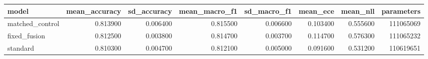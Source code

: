 \begin{tabular}{lrrrrrrr}
\toprule
model & mean\_accuracy & sd\_accuracy & mean\_macro\_f1 & sd\_macro\_f1 & mean\_ece & mean\_nll & parameters \\
\midrule
matched\_control & 0.813900 & 0.006400 & 0.815500 & 0.006600 & 0.103400 & 0.555600 & 111065069 \\
fixed\_fusion & 0.812500 & 0.003800 & 0.814700 & 0.003700 & 0.114700 & 0.576300 & 111065232 \\
standard & 0.810300 & 0.004700 & 0.812100 & 0.005000 & 0.091600 & 0.531200 & 110619651 \\
\bottomrule
\end{tabular}
